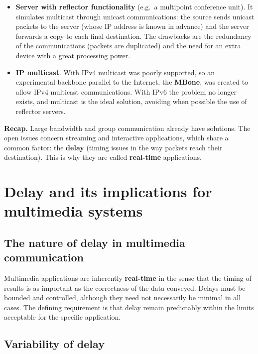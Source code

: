\begin{itemize}
	\item \textbf{Server with reflector functionality} (e.g.\ a multipoint conference unit). It simulates multicast through unicast communications: the source sends unicast packets to the server (whose IP address is known in advance) and the server forwards a copy to each final destination. The drawbacks are the redundancy of the communications (packets are duplicated) and the need for an extra device with a great processing power.
	\item \textbf{IP multicast}. With IPv4 multicast was poorly supported, so an experimental backbone parallel to the Internet, the \textbf{MBone}, was created to allow IPv4 multicast communications. With IPv6 the problem no longer exists, and multicast is the ideal solution, avoiding when possible the use of reflector servers.
\end{itemize}

\begin{notebox}
	\textbf{Recap.} Large bandwidth and group communication already have solutions. The open issues concern streaming and interactive applications, which share a common factor: the \textbf{delay} (timing issues in the way packets reach their destination). This is why they are called \textbf{real-time} applications.
\end{notebox}

\section{Delay and its implications for multimedia systems}

\subsection{The nature of delay in multimedia communication}

Multimedia applications are inherently \textbf{real-time} in the sense that the timing of results is as important as the correctness of the data conveyed. Delays must be bounded and controlled, although they need not necessarily be minimal in all cases. The defining requirement is that delay remain predictably within the limits acceptable for the specific application.

\begin{center}
\end{center}

\subsection{Variability of delay}

